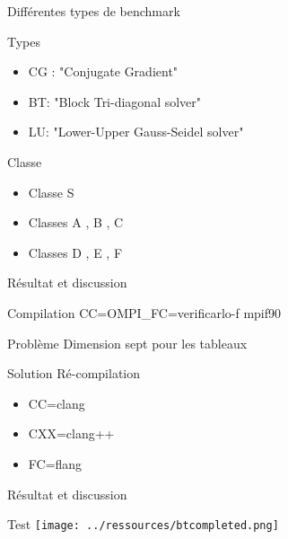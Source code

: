 \documentclass{beamer}
\begin{document}
\begin{frame}{ Différentes types de benchmark}

  \begin{block}{Types}
    \begin{itemize}
    \item CG : "Conjugate Gradient" 
    \item BT: "Block Tri-diagonal solver"
    \item LU: "Lower-Upper Gauss-Seidel solver"
    \end{itemize}
  \end{block}
  
  \begin{block}{Classe}
    \begin{itemize}
    \item Classe S 
    \item  Classes A , B , C 
    \item Classes D , E , F
    \end{itemize}
  \end{block}
  
\end{frame}

\begin{frame}{ Résultat et discussion}

  \begin{block}{Compilation}
    CC=OMPI\_FC=verificarlo-f  mpif90
  \end{block}
  
  \begin{block}{Problème}
    Dimension sept pour les tableaux
  \end{block}
  
  \begin{block}{Solution}
    Ré-compilation
    \begin{itemize}
    \item CC=clang
    \item CXX=clang++
    \item FC=flang
    \end{itemize}
  \end{block}

\end{frame}

\begin{frame}{Résultat et discussion}

  \begin{block}{Test}
    \texttt{[image: ../ressources/btcompleted.png]}
  \end{block}

\end{frame}
\end{document}

